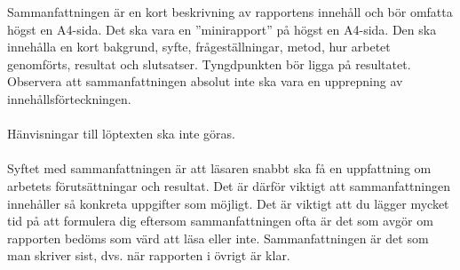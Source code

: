 Sammanfattningen är en kort beskrivning av rapportens innehåll och bör omfatta högst en A4-sida. Det ska vara en ”minirapport” på högst en A4-sida. Den ska innehålla en kort bakgrund, syfte, frågeställningar, metod, hur arbetet genomförts, resultat och slutsatser. Tyngdpunkten bör ligga på resultatet. Observera att sammanfattningen absolut inte ska vara en upprepning av innehållsförteckningen.\\ \\
Hänvisningar till löptexten ska inte göras.\\ \\
Syftet med sammanfattningen är att läsaren snabbt ska få en uppfattning om arbetets förutsättningar och resultat. Det är därför viktigt att sammanfattningen innehåller så konkreta uppgifter som möjligt. Det är viktigt att du lägger mycket tid på att formulera dig eftersom sammanfattningen ofta är det som avgör om rapporten bedöms som värd att läsa eller inte. Sammanfattningen är det som man skriver sist, dvs. när rapporten i övrigt är klar.
